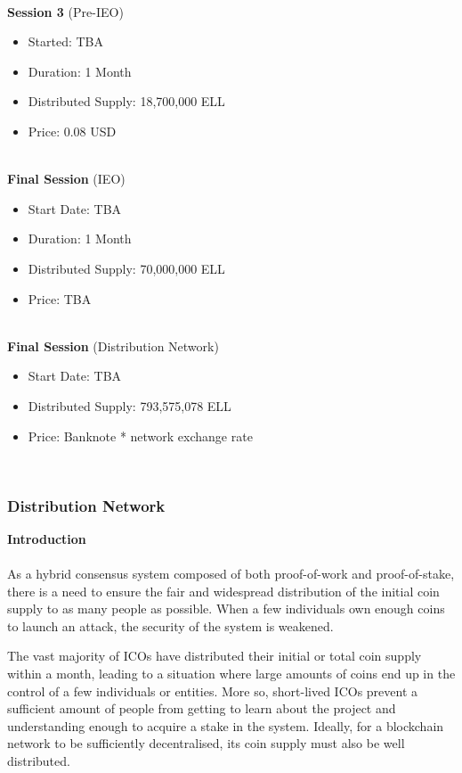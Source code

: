 \noindent
\\\textbf{Session 3} (Pre-IEO)

\begin{itemize}
	\item Started: TBA
	\item Duration: 1 Month
	\item Distributed Supply: 18,700,000 ELL
	\item Price: 0.08 USD
\end{itemize}

\noindent
\\\textbf{Final Session} (IEO)

\begin{itemize}
	\item Start Date: TBA
	\item Duration: 1 Month
	\item Distributed Supply: 70,000,000 ELL
	\item Price: TBA
\end{itemize}

\noindent
\\\textbf{Final Session} (Distribution Network)

\begin{itemize}
	\item Start Date: TBA
	\item Distributed Supply: 793,575,078 ELL
	\item Price: Banknote * network exchange rate
\end{itemize}\\


\subsubsection{Distribution Network} 
\vspace{5mm}
\textbf{Introduction}
\\\\As a hybrid consensus system composed of both proof-of-work and proof-of-stake, there is a need to ensure the fair and widespread distribution of the initial coin supply to as many people as possible. When a few individuals own enough coins to launch an attack, the security of the system is weakened.

The vast majority of ICOs have distributed their initial or total coin supply within a month, leading to a situation where large amounts of coins end up in the control of a few individuals or entities. More so, short-lived ICOs prevent a sufficient amount of people from getting to learn about the project and understanding enough to acquire a stake in the system. Ideally, for a blockchain network to be sufficiently decentralised, its coin supply must also be well distributed. \\\\


